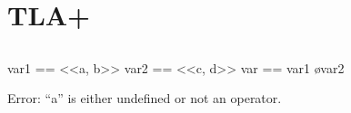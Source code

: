 
\chapter{TLA+}	\label{chapter:tla}

\section{}	\label{section:unchanged}

var1 == <<a, b>>
var2 == <<c, d>>
var == var1 \o var2

Error: ``a'' is either undefined or not an operator.
